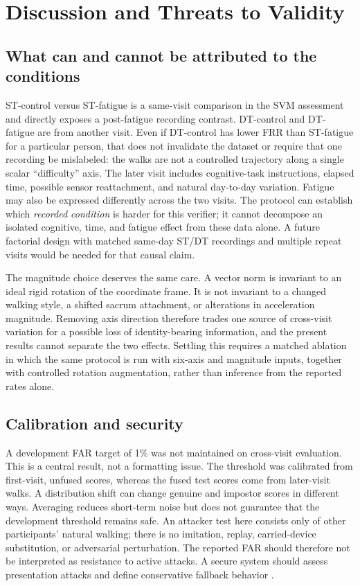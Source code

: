 \documentclass[conference]{IEEEtran}
\begin{document}
\section{Discussion and Threats to Validity}
\subsection{What can and cannot be attributed to the conditions}
ST-control versus ST-fatigue is a same-visit comparison in the SVM assessment and directly exposes a post-fatigue recording contrast. DT-control and DT-fatigue are from another visit. Even if DT-control has lower FRR than ST-fatigue for a particular person, that does not invalidate the dataset or require that one recording be mislabeled: the walks are not a controlled trajectory along a single scalar ``difficulty'' axis. The later visit includes cognitive-task instructions, elapsed time, possible sensor reattachment, and natural day-to-day variation. Fatigue may also be expressed differently across the two visits. The protocol can establish which \emph{recorded condition} is harder for this verifier; it cannot decompose an isolated cognitive, time, and fatigue effect from these data alone. A future factorial design with matched same-day ST/DT recordings and multiple repeat visits would be needed for that causal claim.

The magnitude choice deserves the same care. A vector norm is invariant to an ideal rigid rotation of the coordinate frame. It is not invariant to a changed walking style, a shifted sacrum attachment, or alterations in acceleration magnitude. Removing axis direction therefore trades one source of cross-visit variation for a possible loss of identity-bearing information, and the present results cannot separate the two effects. Settling this requires a matched ablation in which the same protocol is run with six-axis and magnitude inputs, together with controlled rotation augmentation, rather than inference from the reported rates alone.


\subsection{Calibration and security}
A development FAR target of 1\% was not maintained on cross-visit evaluation. This is a central result, not a formatting issue. The threshold was calibrated from first-visit, unfused scores, whereas the fused test scores come from later-visit walks. A distribution shift can change genuine and impostor scores in different ways. Averaging reduces short-term noise but does not guarantee that the development threshold remains safe. An attacker test here consists only of other participants' natural walking; there is no imitation, replay, carried-device substitution, or adversarial perturbation. The reported FAR should therefore not be interpreted as resistance to active attacks. A secure system should assess presentation attacks and define conservative fallback behavior \cite{Jain2004,Abuhamad2020}.
\end{document}

